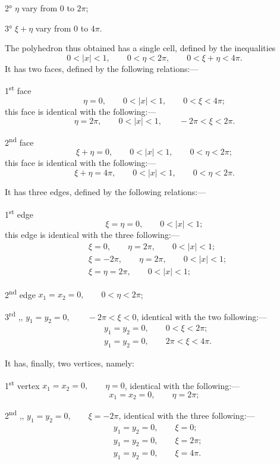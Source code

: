 \documentclass{article}
\begin{document}
2° $\eta$ vary from 0 to $2\pi$;

3° $\xi+\eta$ vary from 0 to $4\pi$.

The polyhedron thus obtained has a single cell, defined by the inequalities
\[ 0 < |x| < 1, \qquad 0 < \eta < 2\pi, \qquad 0 < \xi+\eta < 4\pi. \]
It has two faces, defined by the following relations:---

1\textsuperscript{st} face
\[ \eta = 0, \qquad 0 < |x| < 1, \qquad 0 < \xi < 4\pi; \]
this face is identical with the following:---
\[ \eta = 2\pi, \qquad 0 < |x| < 1, \qquad -2\pi < \xi < 2\pi. \]

2\textsuperscript{nd} face
\[ \xi+\eta = 0, \qquad 0 < |x| < 1, \qquad 0 < \eta < 2\pi; \]
this face is identical with the following:---
\[ \xi+\eta = 4\pi, \qquad 0 < |x| < 1, \qquad 0 < \eta < 2\pi. \]

It has three edges, defined by the following relations:---

1\textsuperscript{st} edge
\[ \xi = \eta = 0, \qquad 0 < |x| < 1; \]
this edge is identical with the three following:---
\[ \begin{aligned} &\xi = 0, \qquad \eta = 2\pi, \qquad 0 < |x| < 1;\\ &\xi = -2\pi, \qquad \eta = 2\pi, \qquad 0 < |x| < 1;\\ &\xi = \eta = 2\pi, \qquad 0 < |x| < 1; \end{aligned} \]

2\textsuperscript{nd} edge $x_{1} = x_{2} = 0, \qquad 0 < \eta < 2\pi$;

3\textsuperscript{rd} ,, $y_{1} = y_{2} = 0, \qquad-2\pi < \xi < 0$, identical with the two following:---
\[ \begin{aligned} &y_{1} = y_{2} = 0, \qquad 0 < \xi < 2\pi;\\ &y_{1} = y_{2} = 0, \qquad 2\pi < \xi < 4\pi. \end{aligned} \]

It has, finally, two vertices, namely:

1\textsuperscript{st} vertex $x_{1} = x_{2} = 0, \qquad\eta = 0$, identical with the following:---
\[ x_{1} = x_{2} = 0, \qquad \eta = 2\pi; \]

2\textsuperscript{nd} ,, $y_{1} = y_{2} = 0, \qquad\xi = -2\pi$, identical with the three following:---
\[ \begin{aligned} &y_{1} = y_{2} = 0, \qquad \xi = 0;\\ &y_{1} = y_{2} = 0, \qquad \xi = 2\pi;\\ &y_{1} = y_{2} = 0, \qquad \xi = 4\pi. \end{aligned} \]
\end{document}
